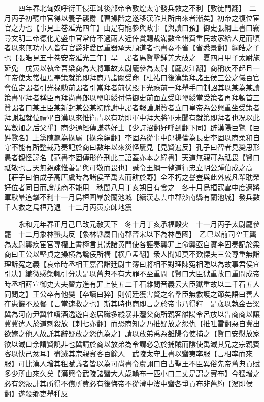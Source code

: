 　　四年春北匈奴呼衍王侵車師後部帝令敦煌太守發兵救之不利【敦徒門翻】　二月丙子初聽中官得以養子襲爵【曹操階之遂移漢祚其所由來者漸矣】初帝之復位宦官之力也【事見上卷延光四年】由是有寵參與政事【與讀曰預】御史張綱上書曰竊尋文明二帝德化尤盛中官常侍不過兩人近倖賞賜裁滿數金惜費重民故家給人足而頃者以來無功小人皆有官爵非愛民重器承天順道者也書奏不省【省悉景翻】綱皓之子也【張皓見五十卷安帝延光三年】旱　謁者馬賢擊鍾羌大破之　夏四月甲子太尉施延免　戊寅以執金吾梁商為大將軍故太尉龐參為太尉【龐皮江翻】商稱疾不起且一年帝使太常桓焉奉策就第即拜商乃詣闕受命【杜祐曰後漢策拜諸王侯三公之儀百官會位定謁者引光禄勲前謁者引當拜者前伏殿下光祿前一拜舉手曰制詔其以某為某讀策書畢拜者稱臣再拜尚書郎以璽印綬付侍御史前面立受印璽綬當受策者再拜頓首三贊謁者曰某王臣某新封某公某初除謝中謁者報謹謝贊者立曰皇帝為公興重坐受策者拜謝起就位禮畢自漢以來惟衛青以有功即軍中拜大將軍未聞有就第即拜者也况以此異數加之后父乎】商少通經傳謙恭好士【少詩沼翻好呼到翻下同】辟漢陽巨覽【巨姓覽名】上黨陳龜為掾屬【掾余絹翻】李固為從事中郎楊倫為長史李固以商柔和自守不能有所整裁乃奏記於商曰數年以來災怪屢見【見賢遍反】孔子曰智者見變思形愚者覩怪諱名【范書李固傳形作刑此二語蓋亦本之緯書】天道無親可為祗畏【賢曰祗敬也言天無親疎惟善是與可敬而畏也】誠令王綱一整道行忠立明公踵伯成之高【莊子曰伯成子高唐虞時為諸侯至禹去而耕於野】全不朽之譽豈與此外戚凡輩耽榮好位者同日而論哉商不能用　秋閏八月丁亥朔日有食之　冬十月烏桓寇雲中度遼將軍耿曅追擊不利十一月烏桓圍曅於蘭池城【續漢志雲中郡沙南縣有蘭池城】發兵數千人救之烏桓乃退　十二月丙寅京師地震

　　永和元年春正月己巳改元赦天下　冬十月丁亥承福殿火　十一月丙子太尉龎參罷　十二月象林蠻夷反【象林縣屬日南郡晉宋以下為林邑國】　乙巳以前司空王龔為太尉龔疾宦官專權上書極言其狀諸黄門使各誣奏龔罪上命龔亟自實李固奏記於梁商曰王公以堅貞之操横為讒佞所構【横戶孟翻】衆人聞知莫不歎慄夫三公尊重無詣理訴寃之義【哀帝時丞相王嘉召詣廷尉主簿曰將相不對理陳寃相踵以為故事君侯宜引决】纎微感槩輒引分决是以舊典不有大罪不至重問【賢曰大臣獄重故曰重問成帝時丞相薛宣御史大夫翟方進有罪上使五二千石雜問音義云大臣獄重故以二千石五人同問之】王公卒有他變【卒讀曰猝】則朝廷獲害賢之名羣臣無救護之節矣語曰善人在患饑不及餐【言當速救之也】斯其時也商即言之於帝事乃得釋　是歲以執金吾梁冀為河南尹冀性嗜酒逸遊自恣居職多縱暴非灋父商所親客雒陽令呂放以告商商以讓冀冀遣人於道刺殺放【刺七亦翻】而恐商知之乃推疑放之怨仇【推吐雷翻惡自冀出欲嫁之他人故託其辭疑放之怨仇為之】請以放弟禹為雒陽令使捕之【賢曰安慰放家欲以滅口余謂賢說非也冀請於商以放弟為令謂必急於捕賊而隂使禹滅其兄之宗親賓客以快己忿耳】盡滅其宗親賓客百餘人　武陵太守上書以蠻夷率服【言相率而來服】可比漢人增其租賦議者皆以為可尚書令虞詡曰自古聖王不臣異俗先帝舊典貢賦多少所由來久矣【漢興令武陵諸蠻大人歲輸布一匹小口二丈是謂之賨布】今猥增之必有怨叛計其所得不償所費必有後悔帝不從澧中漊中蠻各爭貢布非舊約【漊即侯翻】遂殺鄉吏舉種反

